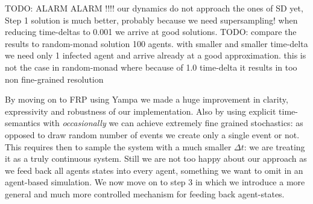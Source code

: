 TODO: ALARM ALARM !!!! our dynamics do not approach the ones of SD yet, Step 1 solution is much better, probably because we need supersampling! when reducing time-deltas to 0.001 we arrive at good solutions.
TODO: compare the results to random-monad solution 100 agents. with smaller and smaller time-delta we need only 1 infected agent and arrive already at a good approximation. this is not the case in random-monad where because of 1.0 time-delta it results in too non fine-grained resolution

By moving on to FRP using Yampa we made a huge improvement in clarity, expressivity and robustness of our implementation. Also by using explicit time-semantics with \textit{occasionally} we can achieve extremely fine grained stochastics: as opposed to draw random number of events we create only a single event or not. This requires then to sample the system with a much smaller $\Delta t$: we are treating it as a truly continuous system.
Still we are not too happy about our approach as we feed back all agents states into every agent, something we want to omit in an agent-based simulation. We now move on to step 3 in which we introduce a more general and much more controlled mechanism for feeding back agent-states. 
